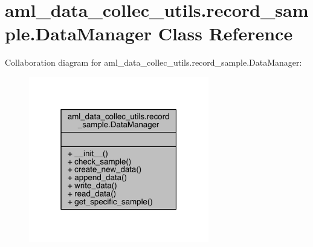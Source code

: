 \hypertarget{classaml__data__collec__utils_1_1record__sample_1_1_data_manager}{}\section{aml\+\_\+data\+\_\+collec\+\_\+utils.\+record\+\_\+sample.\+Data\+Manager Class Reference}
\label{classaml__data__collec__utils_1_1record__sample_1_1_data_manager}


Collaboration diagram for aml\+\_\+data\+\_\+collec\+\_\+utils.\+record\+\_\+sample.\+Data\+Manager\+:
\nopagebreak
\begin{figure}[H]
\begin{center}
\leavevmode
\includegraphics[width=223pt]{classaml__data__collec__utils_1_1record__sample_1_1_data_manager__coll__graph}
\end{center}
\end{figure}
